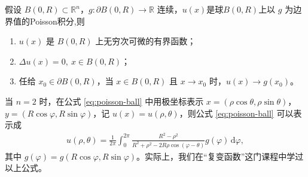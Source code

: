 \documentclass[../../main.tex]{subfiles}%
\begin{document}
\begin{theorem}
假设 $B(0,R)\subset\mathbb{R}^n$，$g:\partial B(0,R)\to\mathbb{R}$ 连续，$u(x)$是球$B(0,R)$上以 $g$ 为边界值的Poisson积分,则
\begin{enumerate}[(1)]
\item $u(x)$ 是 $B(0,R)$ 上无穷次可微的有界函数；
\item $\Delta u(x)=0,\ x\in B(0,R)$；
\item 任给 $x_0\in\partial B(0,R)$，当 $x\in B(0,R)$ 且 $x\to x_0$ 时，$u(x)\to g(x_0)$。
\end{enumerate}
\end{theorem}
\begin{remark}
当 $n=2$ 时，在公式 \eqref{eq:poisson-ball} 中用极坐标表示 $x=(\rho\cos\theta,\rho\sin\theta)$，$y=(R\cos\varphi,R\sin\varphi)$，记 $u(x)=u(\rho,\theta)$，则公式 \eqref{eq:poisson-ball} 可以表示成
\begin{align*}
u(\rho,\theta) = \frac{1}{2\pi}\int_0^{2\pi} \frac{R^2-\rho^2}{R^2+\rho^2-2R\rho\cos(\varphi-\theta)}g(\varphi)\,\mathrm{d}\varphi,
\end{align*}
其中 $g(\varphi)=g(R\cos\varphi,R\sin\varphi)$。实际上，我们在“复变函数”这门课程中学过以上公式。
\end{remark}
\end{document}
